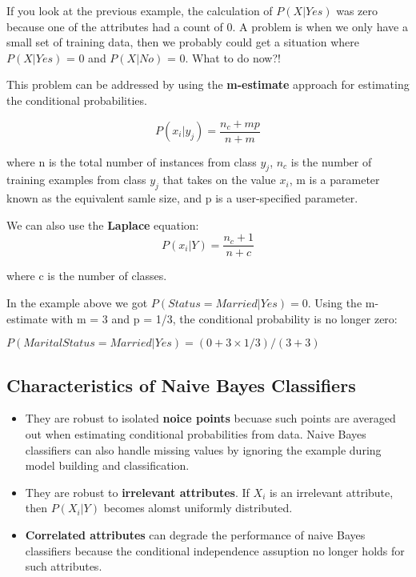 			If you look at the previous example, the calculation of $P(X|Yes)$ was zero
			because one of the attributes had a count of 0. A problem is when we only have 
			a small set of training data, then we probably could get a situation where
			$P(X|Yes)$ = 0 and $P(X|No)$ = 0. What to do now?!

			This problem can be addressed by using the {\bf m-estimate} approach for 
			estimating the conditional probabilities. 

			\begin{equation}
				P(x_{i}|y_{j}) = \frac{n_{c} + mp}{n+m}
			\end{equation}

			where n is the total number of instances from class $y_{j}$, 
			$n_{c}$ is the number of training examples from class $y_{j}$ that takes on the 
			value $x_{i}$, m is a parameter known as the equivalent samle size, and p is a 
			user-specified parameter.

			We can also use the {\bf Laplace} equation:
			\begin{equation}
				P(x_{i}|Y) = \frac{n_{c} +1}{n + c}
			\end{equation}

			where c is the number of classes.

			In the example above we got $P(Status = Married|Yes) = 0$. Using the m-estimate
			with m = 3 and p = 1/3, the conditional probability is no longer zero:

			$P(Marital Status = Married|Yes) = (0+3 \times 1/3)/(3+3)$


		\subsection{Characteristics of Naive Bayes Classifiers}

			\begin{itemize}
				\item They are robust to isolated {\bf noice points} becuase such points are 
				averaged out when estimating conditional probabilities from data. 
				Naive Bayes classifiers can also handle missing values by ignoring the
				example during model building and classification.
				\item They are robust to {\bf irrelevant attributes}. If $X_{i}$ is an irrelevant
				attribute, then $P(X_{i}|Y)$ becomes alomst uniformly distributed. 
				\item {\bf Correlated attributes} can degrade the performance of naive Bayes 
				classifiers because the conditional independence assuption no longer holds 
				for such attributes. 
			\end{itemize}


